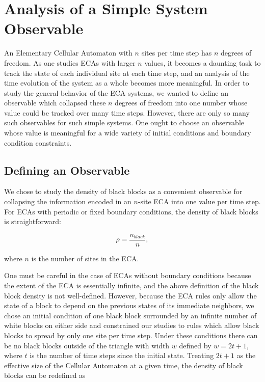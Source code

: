 \section{Analysis of a Simple System Observable}

An Elementary Cellular Automaton with $n$ sites per time step has
$n$ degrees of freedom.
As one studies ECAs with larger $n$ values, it becomes a daunting
task to track the state of each individual site at each time step, and
an analysis of the time evolution of the system as a whole becomes
more meaningful.
In order to study the general behavior of the ECA systems, we wanted
to define an observable which collapsed these $n$ degrees of freedom
into one number whose value could be tracked over many time steps.
However, there are only so many such observables for such simple
systems.
One ought to choose an observable whose value is meaningful for a wide
variety of initial conditions and boundary condition constraints.


\subsection{Defining an Observable}

We chose to study the density of black blocks as a convenient
observable for collapsing the information encoded in an $n$-site ECA
into one value per time step.
For ECAs with periodic or fixed boundary conditions, the density of
black blocks is straightforward:

\begin{equation}
    \rho = \frac{n_{black}}{n},
\end{equation}

\noindent where $n$ is the number of sites in the ECA.

One must be careful in the case of ECAs without boundary conditions
because the extent of the ECA is essentially infinite, and the above
definition of the black block density is not well-defined.
However, because the ECA rules only allow the state of a block to
depend on the previous states of its immediate neighbors, we chose
an initial condition of one black block surrounded by an infinite
number of white blocks on either side and constrained our studies to
rules which allow black blocks to spread by only one site per time
step.
Under these conditions there can be no black blocks outside of the
triangle with width $w$ defined by $w = 2t+1$, where $t$ is the
number of time steps since the initial state.
Treating $2t+1$ as the effective size of the Cellular Automaton at a
given time, the density of black blocks can be redefined as

